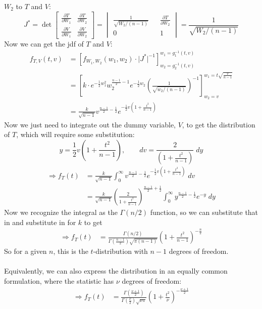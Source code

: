 \documentclass[a4paper,12pt]{scrartcl}
\begin{document}
$W_2$ to $T$ and $V$:
\[ J^* = \det \begin{bmatrix} \frac{\partial T}{\partial W_1} &
   \frac{\partial T}{\partial W_2} \\
   \frac{\partial V}{\partial W_1} &
   \frac{\partial V}{\partial W_2} \end{bmatrix} =
   \begin{vmatrix} \frac{1}{\sqrt{W_2/(n-1)}} && \frac{\partial T}{
      \partial W_2} \\ 0 && 1
   \end{vmatrix} = \frac{1}{\sqrt{W_2/(n-1)}}
   \]
Now we can get the jdf of $T$ and $V$:
\begin{align*}
   f_{T,V}(t,v) &= \left[ f_{W_1,W_2}(w_1, w_2) \cdot
      \lvert J^* \rvert^{-1}
      \right]^{w_1 = g_1^{-1}(t,v)}_{w_2 = g_2^{-1}(t,v)}\\
   &= \left[ k \cdot e^{-\frac{1}{2} w_1^2}
      w_2^{\frac{n-1}{2} - 1} e^{-\frac{1}{2} w_2}  \left(
      \frac{1}{\sqrt{w_2/(n-1)}}\right)^{-1}
      \right]^{w_1 = t \sqrt{\frac{v}{
      n-1}}}_{w_2=v}\\
      &= \frac{k}{\sqrt{n-1}} v^{\frac{n-1}{2} - \frac{1}{2}}
      e^{-\frac{1}{2} v\left( 1 + \frac{t^2}{n-1}\right)}
\end{align*}
Now we just need to integrate out the dummy variable, $V$, to
get the distribution of $T$, which will require some substitution:
\[ y = \frac{1}{2} v \left( 1 + \frac{t^2}{n-1} \right), \qquad
   dv = \frac{2}{\left( 1 + \frac{t^2}{n-1} \right)} \; dy \]
\begin{align*}
   \Rightarrow f_{T}(t) &=\frac{k}{\sqrt{n-1}} \int^\infty_0
      v^{\frac{n-1}{2} - \frac{1}{2}}
      e^{-\frac{1}{2} v\left( 1 + \frac{t^2}{n-1}\right)} \; dv \\
      &= \frac{k}{\sqrt{n-1}} \left( \frac{2}{ 1 + \frac{t^2}{n-1} }
      \right)^{\frac{n-1}{2} + \frac{1}{2}} \int^\infty_0
      y^{\frac{n-1}{2} - \frac{1}{2}} e^{-y} \; dy
\end{align*}
Now we recognize the integral as the $\Gamma(n/2)$ function, so
we can substitute that in and substitute in for $k$ to get
\begin{align*}
   \Rightarrow f_{T}(t) &=\frac{\Gamma(n/2)}{
      \Gamma\left(\frac{n-1}{2}\right)\sqrt{\pi(n-1)}}
      \left( 1 + \frac{t^2}{n-1}\right)^{-\frac{n}{2}}
\end{align*}
So for a given $n$, this is the $t$-distribution with $n-1$ degrees
of freedom.
\\
\\
Equivalently, we can also express the distribution in an equally
common formulation, where the statistic has $\nu$ degrees of freedom:
\begin{align*}
   \Rightarrow f_{T}(t) &=\frac{\Gamma\left(\frac{\nu+1}{2}\right)}{
      \Gamma\left(\frac{\nu}{2}\right)\sqrt{\nu\pi}}
      \left( 1 + \frac{t^2}{\nu}\right)^{-\frac{\nu+1}{2}}
\end{align*}
\end{document}
